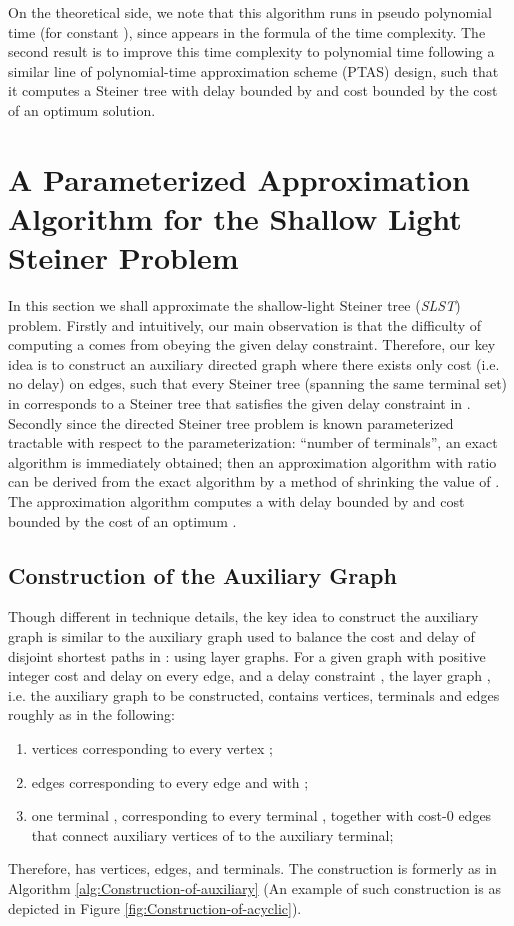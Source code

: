 \documentclass[english,runningheads,a4paper]{llncs}
\begin{document}
On the theoretical side, we note that this algorithm runs in pseudo
polynomial time (for constant ), since  appears in the formula
of the time complexity. The second result is to improve this time
complexity to polynomial time 
following a similar line of polynomial-time approximation scheme (PTAS)
design, such that it computes a Steiner tree with delay bounded by
 and cost bounded by the cost of an optimum solution.


\section{A Parameterized Approximation Algorithm for the Shallow Light Steiner
Problem}

In this section we shall approximate the shallow-light Steiner tree
(\emph{SLST}) problem. Firstly and intuitively, our main observation
is that the difficulty of computing a \emph{} comes from obeying
the given delay constraint. Therefore, our key idea is to construct
an auxiliary directed graph  where there exists only cost (i.e.
no delay) on edges, such that every Steiner tree (spanning the same
terminal set) in  corresponds to a Steiner tree that satisfies
the given delay constraint  in . Secondly since the directed
Steiner tree problem is known parameterized tractable with respect
to the parameterization: ``number of terminals''\cite{guo2011parameterized,ding2007finding},
an exact algorithm is immediately obtained; then an approximation
algorithm with ratio  can be derived from the exact
algorithm by a method of shrinking the value of . The approximation
algorithm computes a  with delay bounded by 
and cost bounded by the cost of an optimum .


\subsection{Construction of the Auxiliary Graph}

Though different in technique details, the key idea to construct the
auxiliary graph is similar to the auxiliary graph used to balance
the cost and delay of  disjoint shortest paths in \cite{guo2013improved}:
using layer graphs. For a given graph  with positive integer
cost and delay on every edge, and a delay constraint , the layer
graph , i.e. the auxiliary graph to be constructed, contains vertices,
terminals and edges roughly as in the following:
\begin{enumerate}
\item  vertices  corresponding to every
vertex  ;
\item  edges 
corresponding to every edge 
and with ;
\item one terminal , corresponding to every terminal ,
together with cost-0 edges 
that connect auxiliary vertices of  to the auxiliary terminal;
\end{enumerate}
Therefore,  has  vertices,  edges, and 
terminals. The construction is formerly as in Algorithm \ref{alg:Construction-of-auxiliary}
(An example of such construction is as depicted in Figure \ref{fig:Construction-of-acyclic}).
\end{document}
